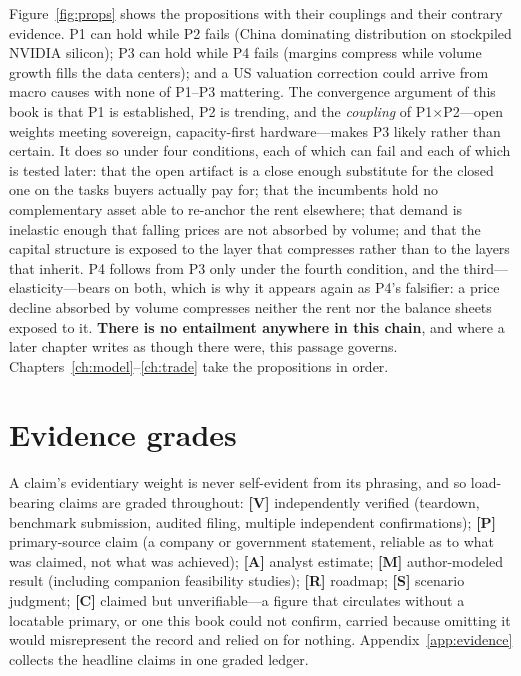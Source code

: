 Figure~\ref{fig:props} shows the propositions with their couplings and their contrary evidence. P1 can hold while P2 fails (China dominating distribution on stockpiled NVIDIA silicon); P3 can hold while P4 fails (margins compress while volume growth fills the data centers); and a US valuation correction could arrive from macro causes with none of P1--P3 mattering. The convergence argument of this book is that P1 is established, P2 is trending, and the \emph{coupling} of P1$\times$P2---open weights meeting sovereign, capacity-first hardware---makes P3 likely rather than certain. It does so under four conditions, each of which can fail and each of which is tested later: that the open artifact is a close enough substitute for the closed one on the tasks buyers actually pay for; that the incumbents hold no complementary asset able to re-anchor the rent elsewhere; that demand is inelastic enough that falling prices are not absorbed by volume; and that the capital structure is exposed to the layer that compresses rather than to the layers that inherit. P4 follows from P3 only under the fourth condition, and the third---elasticity---bears on both, which is why it appears again as P4's falsifier: a price decline absorbed by volume compresses neither the rent nor the balance sheets exposed to it. \textbf{There is no entailment anywhere in this chain}, and where a later chapter writes as though there were, this passage governs. Chapters~\ref{ch:model}--\ref{ch:trade} take the propositions in order.



\section{Evidence grades}
\label{sec:evidence}

A claim's evidentiary weight is never self-evident from its phrasing, and so load-bearing claims are graded throughout: \textbf{[V]} independently verified (teardown, benchmark submission, audited filing, multiple independent confirmations); \textbf{[P]} primary-source claim (a company or government statement, reliable as to what was claimed, not what was achieved); \textbf{[A]} analyst estimate; \textbf{[M]} author-modeled result (including companion feasibility studies); \textbf{[R]} roadmap; \textbf{[S]} scenario judgment; \textbf{[C]} claimed but unverifiable---a figure that circulates without a locatable primary, or one this book could not confirm, carried because omitting it would misrepresent the record and relied on for nothing. Appendix~\ref{app:evidence} collects the headline claims in one graded ledger.


